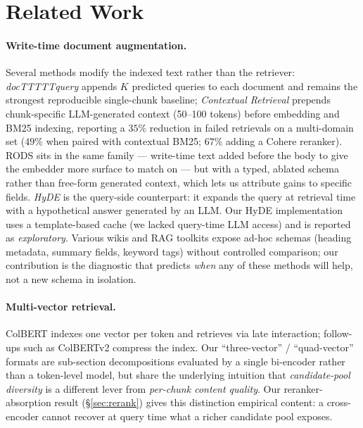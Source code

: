 \documentclass[11pt]{article}
\begin{document}
\section{Related Work}
\label{sec:related}

\paragraph{Write-time document augmentation.} Several methods modify
the indexed text rather than the retriever: \emph{docTTTTTquery}
\citep{nogueira2019docttttquery} appends $K$ predicted queries to each
document and remains the strongest reproducible single-chunk baseline;
\emph{Contextual Retrieval} \citep{anthropic2024contextual} prepends
chunk-specific LLM-generated context (50--100 tokens) before embedding
and BM25 indexing, reporting a $35\%$ reduction in failed retrievals
on a multi-domain set ($49\%$ when paired with contextual BM25; $67\%$
adding a Cohere reranker). RODS sits in the same family --- write-time
text added before the body to give the embedder more surface to match
on --- but with a typed, ablated schema rather than free-form
generated context, which lets us attribute gains to specific fields.
\emph{HyDE} \citep{gao2022hyde} is the query-side counterpart: it
expands the query at retrieval time with a hypothetical answer
generated by an LLM. Our HyDE implementation uses a template-based
cache (we lacked query-time LLM access) and is reported as
\emph{exploratory}. Various wikis and RAG toolkits expose ad-hoc
schemas (heading metadata, summary fields, keyword tags) without
controlled comparison; our contribution is the diagnostic that
predicts \emph{when} any of these methods will help, not a new
schema in isolation.

\paragraph{Multi-vector retrieval.} ColBERT \citep{khattab2020colbert}
indexes one vector per token and retrieves via late interaction;
follow-ups such as ColBERTv2 \citep{santhanam2022colbertv2} compress
the index. Our ``three-vector'' / ``quad-vector'' formats are
sub-section decompositions evaluated by a single bi-encoder rather
than a token-level model, but share the underlying intuition that
\emph{candidate-pool diversity} is a different lever from
\emph{per-chunk content quality}. Our reranker-absorption result
(\S\ref{sec:rerank}) gives this distinction empirical content: a
cross-encoder cannot recover at query time what a richer candidate
pool exposes.
\end{document}
